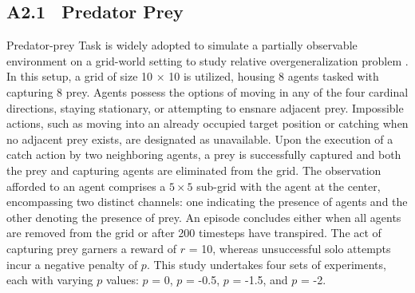 
\subsection{A2.1 \ Predator Prey}\label{predator}

 Predator-prey Task is widely adopted to simulate a  partially observable environment on a  grid-world setting to study relative overgeneralization problem \cite{deep_coori_graph}. In this setup, a grid of size 10 × 10 is utilized, housing 8 agents tasked with capturing 8 prey. Agents possess the options of moving in any of the four cardinal directions, staying stationary, or attempting to ensnare adjacent prey. 
 Impossible actions, such as moving into an already occupied target position or catching when no adjacent prey exists, are designated as unavailable. Upon the execution of a catch action by two neighboring agents, a prey is successfully captured and both the prey and capturing agents are eliminated from the grid. The observation afforded to an agent comprises a $5 × 5$ sub-grid with the agent at the center, encompassing two distinct channels: one indicating the presence of agents and the other denoting the presence of prey.  An episode concludes either when all agents are removed from the grid or after 200 timesteps have transpired. The act of capturing prey garners a reward of $r$ = 10, whereas unsuccessful solo attempts incur a negative penalty of $p$. This study undertakes four sets of experiments, each with varying $p$ values: $p$ = 0, $p$ = -0.5, $p$ = -1.5, and $p$ = -2.



